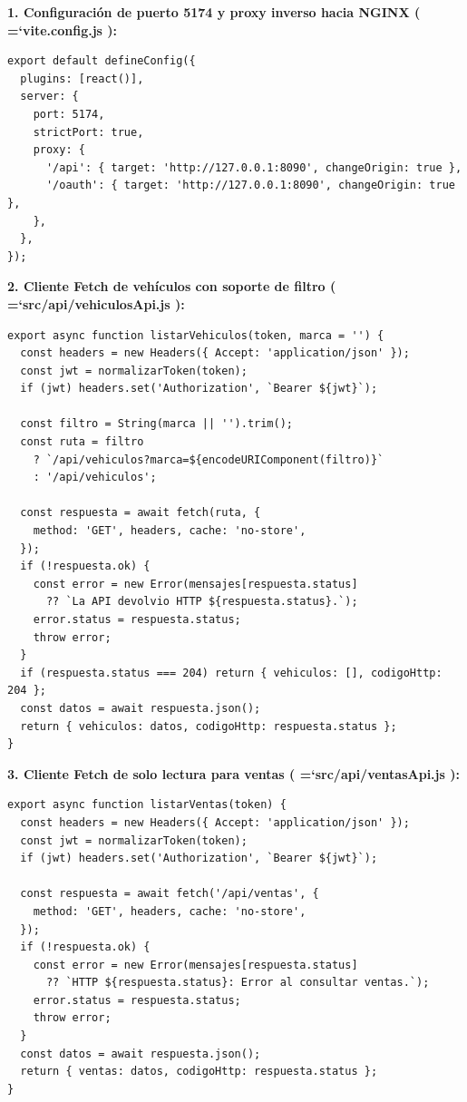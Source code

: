 \documentclass[11pt,a4paper]{article}
\renewcommand{\_}{\oldunderscore\allowbreak}
\DeclareRobustCommand{\texttt}[1]{%
  {\upshape\ttfamily\fontsize{9}{10.8}\selectfont\hyphenchar\font=`\-\relax #1}%
}
\begin{document}
\vspace{0.1cm}
\noindent\textbf{1. Configuración de puerto 5174 y proxy inverso hacia NGINX (\texttt{vite.\allowbreak{}config.\allowbreak{}js}):}
\begin{lstlisting}
export default defineConfig({
  plugins: [react()],
  server: {
    port: 5174,
    strictPort: true,
    proxy: {
      '/api': { target: 'http://127.0.0.1:8090', changeOrigin: true },
      '/oauth': { target: 'http://127.0.0.1:8090', changeOrigin: true },
    },
  },
});
\end{lstlisting}

\vspace{0.1cm}
\noindent\textbf{2. Cliente Fetch de vehículos con soporte de filtro (\texttt{src/\allowbreak{}api/\allowbreak{}vehiculosApi.\allowbreak{}js}):}
\begin{lstlisting}
export async function listarVehiculos(token, marca = '') {
  const headers = new Headers({ Accept: 'application/json' });
  const jwt = normalizarToken(token);
  if (jwt) headers.set('Authorization', `Bearer ${jwt}`);

  const filtro = String(marca || '').trim();
  const ruta = filtro
    ? `/api/vehiculos?marca=${encodeURIComponent(filtro)}`
    : '/api/vehiculos';

  const respuesta = await fetch(ruta, {
    method: 'GET', headers, cache: 'no-store',
  });
  if (!respuesta.ok) {
    const error = new Error(mensajes[respuesta.status]
      ?? `La API devolvio HTTP ${respuesta.status}.`);
    error.status = respuesta.status;
    throw error;
  }
  if (respuesta.status === 204) return { vehiculos: [], codigoHttp: 204 };
  const datos = await respuesta.json();
  return { vehiculos: datos, codigoHttp: respuesta.status };
}
\end{lstlisting}

\vspace{0.1cm}
\noindent\textbf{3. Cliente Fetch de solo lectura para ventas (\texttt{src/\allowbreak{}api/\allowbreak{}ventasApi.\allowbreak{}js}):}
\begin{lstlisting}
export async function listarVentas(token) {
  const headers = new Headers({ Accept: 'application/json' });
  const jwt = normalizarToken(token);
  if (jwt) headers.set('Authorization', `Bearer ${jwt}`);

  const respuesta = await fetch('/api/ventas', {
    method: 'GET', headers, cache: 'no-store',
  });
  if (!respuesta.ok) {
    const error = new Error(mensajes[respuesta.status]
      ?? `HTTP ${respuesta.status}: Error al consultar ventas.`);
    error.status = respuesta.status;
    throw error;
  }
  const datos = await respuesta.json();
  return { ventas: datos, codigoHttp: respuesta.status };
}
\end{lstlisting}
\end{document}
